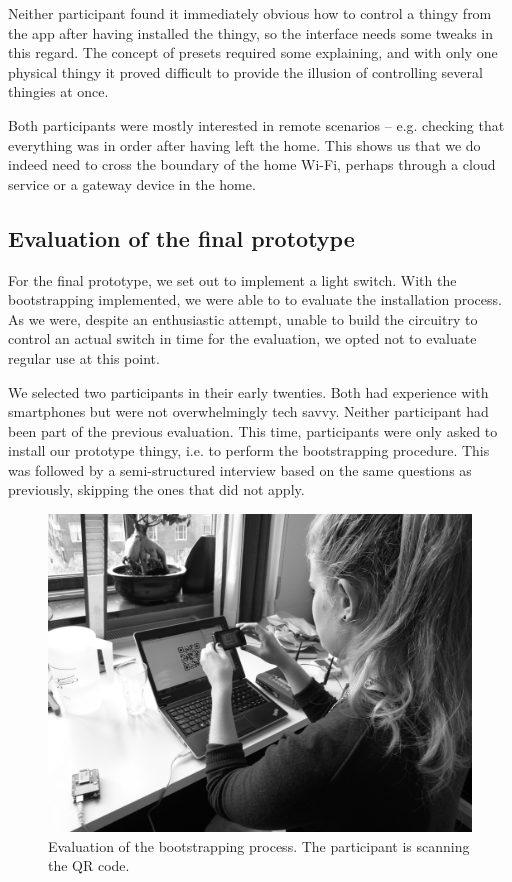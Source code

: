 \documentclass{ubicomp2012}
\begin{document}
Neither participant found it immediately obvious how to control a thingy from the app after having installed the thingy, so the interface needs some tweaks in this regard. The concept of presets required some explaining, and with only one physical thingy it proved difficult to provide the illusion of controlling several thingies at once.

Both participants were mostly interested in remote scenarios -- e.g. checking that everything was in order after having left the home. This shows us that we do indeed need to cross the boundary of the home Wi-Fi, perhaps through a cloud service or a gateway device in the home.

\subsection{Evaluation of the final prototype}

For the final prototype, we set out to implement a light switch. With the bootstrapping implemented, we were able to to evaluate the installation process. As we were, despite an enthusiastic attempt, unable to build the circuitry to control an actual switch in time for the evaluation, we opted not to evaluate regular use at this point.

We selected two participants in their early twenties. Both had experience with smartphones but were not overwhelmingly tech savvy. Neither participant had been part of the previous evaluation. This time, participants were only asked to install our prototype thingy, i.e. to perform the bootstrapping procedure. This was followed by a semi-structured interview based on the same questions as previously, skipping the ones that did not apply.

\begin{figure}[th]
\begin{center}
\includegraphics[width=0.90\columnwidth]{figures/evaluation-picture.jpg}
\end{center}
\caption{Evaluation of the bootstrapping process. The participant is scanning the QR code.}
\label{fig:evalPic}
\end{figure}
\end{document}
